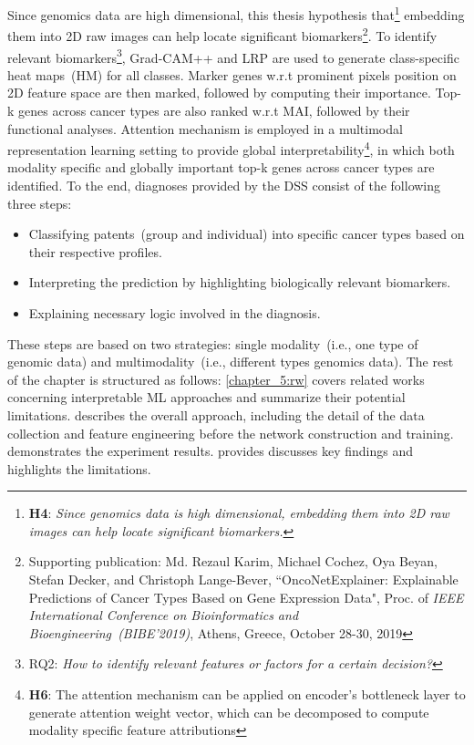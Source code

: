 \hspace*{3.5mm} Since genomics data are high dimensional, this thesis hypothesis that\footnote{\textbf{H4}: \textit{Since genomics data is high dimensional, embedding them into 2D raw images can help locate significant biomarkers.}} embedding them into 2D raw images can help locate significant biomarkers\footnote{Supporting publication: Md. Rezaul Karim, Michael Cochez, Oya Beyan, Stefan Decker, and Christoph Lange-Bever, ``OncoNetExplainer: Explainable Predictions of Cancer Types Based on Gene Expression Data", Proc. of \emph{IEEE International Conference on Bioinformatics and Bioengineering~(BIBE'2019)}, Athens, Greece, October 28-30, 2019}. %
To identify relevant biomarkers\footnote{RQ2: \textit{How to identify relevant features or factors for a certain decision?}}, Grad-CAM++ and LRP are used to generate class-specific heat maps~(HM) for all classes. 
Marker genes w.r.t prominent pixels position on 2D feature space are then marked, followed by computing their importance. Top-k genes across cancer types are also ranked w.r.t MAI, followed by their functional analyses.  
Attention mechanism is employed in a multimodal representation learning setting to provide global interpretability\footnote{\textbf{H6}: The attention mechanism can be applied on encoder's bottleneck layer to generate attention weight vector, which can be decomposed to compute modality specific feature attributions}, in which both modality specific and globally important top-k genes across cancer types are identified. To the end, diagnoses provided by the DSS consist of the following three steps: 

\begin{itemize}[noitemsep]
\vspace{-2mm}
    \item Classifying patents~(group and individual) into specific cancer types based on their respective profiles.
    \item Interpreting the prediction by highlighting biologically relevant biomarkers.
    \item Explaining necessary logic involved in the diagnosis. 
    \vspace{-2mm}
\end{itemize}

\hspace*{3.5mm} These steps are based on two strategies: single modality~(i.e., one type of genomic data) and multimodality~(i.e., different types genomics data). 
The rest of the chapter is structured as follows: \cref{chapter_5:rw} covers related works concerning interpretable ML approaches and summarize their potential limitations.  describes the overall approach, including the detail of the data collection and feature engineering before the network construction and training.  demonstrates the experiment results.  provides discusses key findings and highlights the limitations. %

